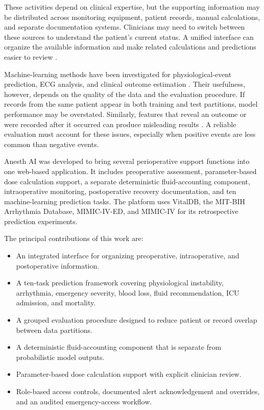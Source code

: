 \documentclass[conference]{IEEEtran}
\begin{document}
These activities depend on clinical expertise, but the supporting information may be distributed across monitoring equipment, patient records, manual calculations, and separate documentation systems. Clinicians may need to switch between these sources to understand the patient's current status. A unified interface can organize the available information and make related calculations and predictions easier to review \cite{ref3,ref4}.

Machine-learning methods have been investigated for physiological-event prediction, ECG analysis, and clinical outcome estimation \cite{ref5,ref6}. Their usefulness, however, depends on the quality of the data and the evaluation procedure. If records from the same patient appear in both training and test partitions, model performance may be overstated. Similarly, features that reveal an outcome or were recorded after it occurred can produce misleading results \cite{ref18,ref25}. A reliable evaluation must account for these issues, especially when positive events are less common than negative events.

Anesth AI was developed to bring several perioperative support functions into one web-based application. It includes preoperative assessment, parameter-based dose calculation support, a separate deterministic fluid-accounting component, intraoperative monitoring, postoperative recovery documentation, and ten machine-learning prediction tasks. The platform uses VitalDB, the MIT-BIH Arrhythmia Database, MIMIC-IV-ED, and MIMIC-IV for its retrospective prediction experiments.

The principal contributions of this work are:
\begin{itemize}
\item An integrated interface for organizing preoperative, intraoperative, and postoperative information.
\item A ten-task prediction framework covering physiological instability, arrhythmia, emergency severity, blood loss, fluid recommendation, ICU admission, and mortality.
\item A grouped evaluation procedure designed to reduce patient or record overlap between data partitions.
\item A deterministic fluid-accounting component that is separate from probabilistic model outputs.
\item Parameter-based dose calculation support with explicit clinician review.
\item Role-based access controls, documented alert acknowledgement and overrides, and an audited emergency-access workflow.
\end{itemize}
\end{document}
